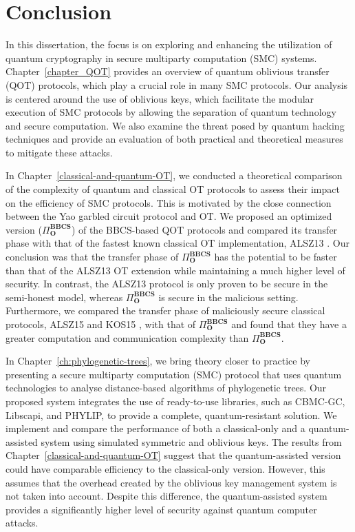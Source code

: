 


%

\chapter{Conclusion}
\label{ch:conclusion}

In this dissertation, the focus is on exploring and enhancing the utilization of quantum cryptography in secure multiparty computation (SMC) systems. Chapter~\ref{chapter_QOT} provides an overview of quantum oblivious transfer (QOT) protocols, which play a crucial role in many SMC protocols. Our analysis is centered around the use of oblivious keys, which facilitate the modular execution of SMC protocols by allowing the separation of quantum technology and secure computation. We also examine the threat posed by quantum hacking techniques and provide an evaluation of both practical and theoretical measures to mitigate these attacks.

In Chapter~\ref{classical-and-quantum-OT}, we conducted a theoretical comparison of the complexity of quantum and classical OT protocols to assess their impact on the efficiency of SMC protocols. This is motivated by the close connection between the Yao garbled circuit protocol and OT. We proposed an optimized version ($\Pi^{\textbf{BBCS}}_{\textbf{O}}$) of the BBCS-based QOT protocols and compared its transfer phase with that of the fastest known classical OT implementation, ALSZ13 \cite{ALSZ13}. Our conclusion was that the transfer phase of $\Pi^{\textbf{BBCS}}_{\textbf{O}}$ has the potential to be faster than that of the ALSZ13 OT extension while maintaining a much higher level of security. In contrast, the ALSZ13 protocol is only proven to be secure in the semi-honest model, whereas $\Pi^{\textbf{BBCS}}_{\textbf{O}}$ is secure in the malicious setting.
Furthermore, we compared the transfer phase of maliciously secure classical protocols, ALSZ15 \cite{ALSZ15} and KOS15 \cite{KOS15}, with that of $\Pi^{\textbf{BBCS}}_{\textbf{O}}$ and found that they have a greater computation and communication complexity than $\Pi^{\textbf{BBCS}}_{\textbf{O}}$.

In Chapter~\ref{ch:phylogenetic-trees}, we bring theory closer to practice by presenting a secure multiparty computation (SMC) protocol that uses quantum technologies to analyse distance-based algorithms of phylogenetic trees. Our proposed system integrates the use of ready-to-use libraries, such as CBMC-GC, Libscapi, and PHYLIP, to provide a complete, quantum-resistant solution. We implement and compare the performance of both a classical-only and a quantum-assisted system using simulated symmetric and oblivious keys. The results from Chapter~\ref{classical-and-quantum-OT} suggest that the quantum-assisted version could have comparable efficiency to the classical-only version. However, this assumes that the overhead created by the oblivious key management system is not taken into account. Despite this difference, the quantum-assisted system provides a significantly higher level of security against quantum computer attacks.

